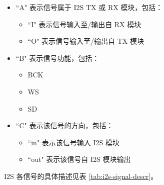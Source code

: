 \documentclass[main\_\_CN.tex]{subfiles}
\begin{document}
\begin{itemize}
    \item ``A" 表示信号属于 I2S TX 或 RX 模块，包括：
    \begin{itemize}
        \item ``I" 表示信号输入至/输出自 RX 模块
        \item ``O" 表示信号输入至/输出自 TX 模块
    \end{itemize}
    \item ``B" 表示信号功能，包括：
    \begin{itemize}
        \item BCK
        \item WS
        \item SD
    \end{itemize}
    \item ``C" 表示该信号的方向，包括：
    \begin{itemize}
        \item ``in" 表示该信号输入 I2S 模块
        \item ``out" 表示该信号自 I2S 模块输出
    \end{itemize}
\end{itemize}

I2S 各信号的具体描述见表 \ref{tab:i2s-signal-descr}。
\end{document}
